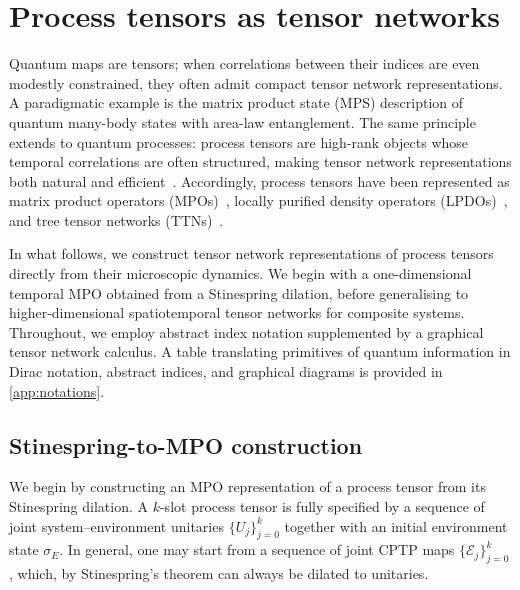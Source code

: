 \section{Process tensors as tensor networks}\label{sec:pt-tn}
Quantum maps are tensors; when correlations between their indices are even modestly constrained, they often admit compact tensor network representations. A paradigmatic example is the matrix product state (MPS) description of quantum many-body states with area-law entanglement. The same principle extends to quantum processes: process tensors are high-rank objects whose temporal correlations are often structured, making tensor network representations both natural and efficient~\cite{keelingProcessTensorApproaches2025}. Accordingly, process tensors have been represented as matrix product operators (MPOs)~\cite{pollockNonMarkovianQuantumProcesses2018,cygorekUnderstandingUtilizingInner2025}, locally purified density operators (LPDOs)~\cite{whiteUnifyingNonMarkovianCharacterization2025}, and tree tensor networks (TTNs)~\cite{dowlingCapturingLongRangeMemory2024}.

In what follows, we construct tensor network representations of process tensors directly from their microscopic dynamics. We begin with a one-dimensional temporal MPO obtained from a Stinespring dilation, before generalising to higher-dimensional spatiotemporal tensor networks for composite systems. Throughout, we employ abstract index notation supplemented by a graphical tensor network calculus. A table translating primitives of quantum information in Dirac notation, abstract indices, and graphical diagrams is provided in \cref{app:notations}.

\subsection{Stinespring-to-MPO construction}
We begin by constructing an MPO representation of a process tensor from its Stinespring dilation. A \(k\)-slot process tensor is fully specified by a sequence of joint system--environment unitaries \(\{U_j\}_{j=0}^k\) together with an initial environment state \(\sigma_E\). In general, one may start from a sequence of joint CPTP maps \(\{\mathcal{E}_j\}_{j=0}^k\), which, by Stinespring's theorem can always be dilated to unitaries.

